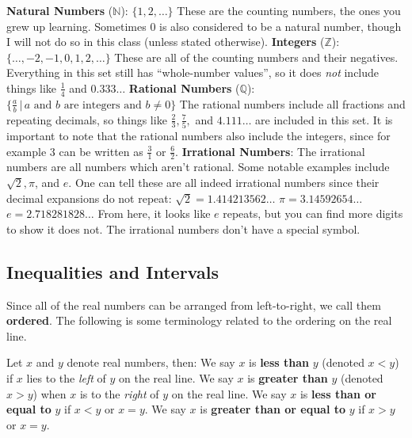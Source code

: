 \documentclass{article}
\newcommand{\tb}[1]{\textbf{#1}}
\begin{document}
\begin{outline}
    \1 \tb{Natural Numbers} ($\mathbb{N}$): $\{1, 2, \ldots\}$ These are the counting numbers, the ones you grew up learning. Sometimes $0$ is also considered to be a natural number, though I will not do so in this class (unless stated otherwise).
    \1 \tb{Integers} ($\mathbb{Z}$): $\{\ldots, -2, -1, 0, 1, 2, \ldots\}$ These are all of the counting numbers and their negatives. Everything in this set still has ``whole-number values'', so it does \emph{not} include things like $\frac{1}{4}$ and $0.333 \ldots$
    \1 \tb{Rational Numbers} ($\mathbb{Q}$): $\{\frac{a}{b}\,|\, a \textrm{ and } b \textrm{ are integers and } b \neq 0\}$ The rational numbers include all fractions and repeating decimals, so things like $\frac{2}{3}, \frac{7}{5},$ and $4.111\ldots$ are included in this set. It is important to note that the rational numbers also include the integers, since for example $3$ can be written as $\frac{3}{1}$ or $\frac{6}{2}$.
    \1 \tb{Irrational Numbers}: The irrational numbers are all numbers which aren't rational. Some notable examples include $\sqrt{2}, \pi$, and $e$. One can tell these are all indeed irrational numbers since their decimal expansions do not repeat:
        \2 $\sqrt{2} = 1.414213562 \ldots$
        \2 $\pi = 3.14592654 \ldots$
        \2 $e = 2.718281828 \ldots$
    \1[] From here, it looks like $e$ repeats, but you can find more digits to show it does not. The irrational numbers don't have a special symbol.
\end{outline}

\subsection{Inequalities and Intervals}

Since all of the real numbers can be arranged from left-to-right, we call them \tb{ordered}. The following is some terminology related to the ordering on the real line.

\vspace{5pt}
\begin{outline}
    \0 Let $x$ and $y$ denote real numbers, then:
    \1 We say $x$ is \tb{less than} $y$ (denoted $x<y$) if $x$ lies to the \emph{left} of $y$ on the real line.
    \1 We say $x$ is \tb{greater than} $y$ (denoted $x>y$) when $x$ is to the \emph{right} of $y$ on the real line.
    \1 We say $x$ is \tb{less than or equal to} $y$ if $x<y$ or $x=y$.
    \1 We say $x$ is \tb{greater than or equal to} $y$ if $x>y$ or $x=y$.
\end{outline}
\end{document}
